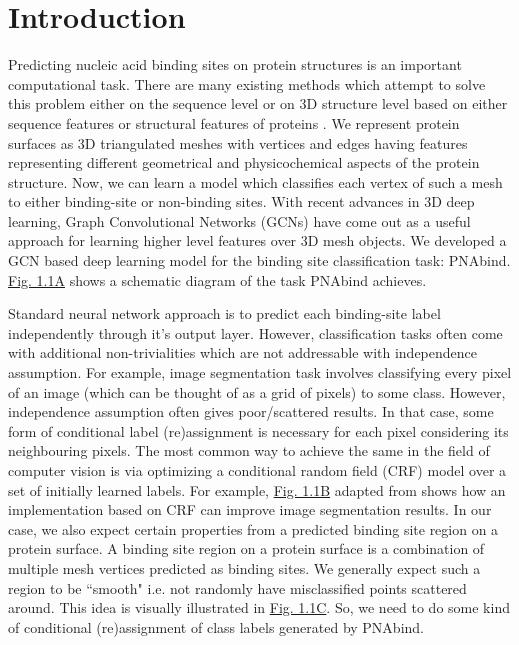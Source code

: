 \section{Introduction} Predicting nucleic acid binding sites on protein structures is an important computational task.  There are many existing methods which attempt to solve this problem either on the sequence level or on 3D structure level based on either sequence features or structural features of proteins \citep{deng2018pdrlgb, wang2010bindn+, wang2006bindn, li2013predna}.
We represent protein surfaces as 3D triangulated meshes with 
vertices and edges having features representing different geometrical and physicochemical aspects of the protein structure. Now, we can learn a model which classifies each vertex of such a mesh to either binding-site or
non-binding sites. With recent advances in 3D deep learning, Graph Convolutional
Networks (GCNs) have come out as a useful approach for learning higher level features over
3D mesh objects. We developed a GCN based deep learning model for the binding site classification
task: PNAbind. \hyperref[fig:crf_concept]{Fig. 1.1A} shows a schematic diagram of
the task PNAbind achieves.

Standard neural network approach is to predict each binding-site label independently
through it's output layer. However, classification tasks often come with additional non-trivialities which
are not addressable with independence assumption.  For example, image segmentation task involves
classifying every pixel of an image (which can be thought of as a grid of pixels) to some class.
However, independence assumption often gives poor/scattered results. In that case, some form of
conditional label (re)assignment is necessary for each pixel considering its neighbouring pixels. The
most common way to achieve the same in the field of computer vision is via optimizing a conditional
random  field (CRF) model over a set of initially  learned labels. For example,
\hyperref[fig:crf_concept]{Fig. 1.1B} adapted
from \citet{krahenbuhl2012efficient}  shows how an implementation based on CRF can improve image
segmentation results. In our case, we also expect certain properties from a predicted binding site
region on a protein surface. A binding site region on a protein surface is a combination
of multiple mesh vertices predicted as binding sites. We generally expect such a region to be
``smooth" i.e. not randomly have misclassified points scattered around. This idea is visually illustrated in
\hyperref[fig:crf_concept]{Fig. 1.1C}. So, we need to do some kind
of conditional (re)assignment of class labels generated by PNAbind.

